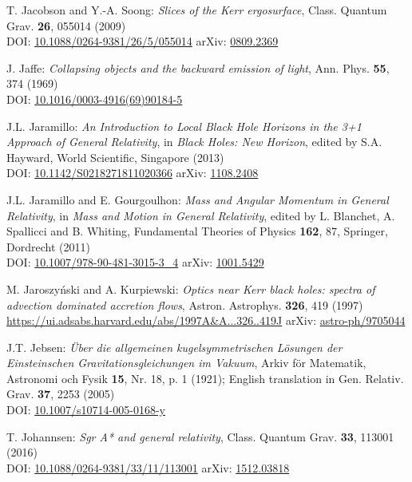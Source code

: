 \begin{thebibliography}{123}
T. Jacobson and Y.-A. Soong:
{\em Slices of the Kerr ergosurface},
Class. Quantum Grav. {\bf 26}, 055014 (2009)\\
DOI: \href{https://doi.org/10.1088/0264-9381/26/5/055014}{10.1088/0264-9381/26/5/055014}\hfill
arXiv: \href{https://arxiv.org/abs/0809.2369}{0809.2369}

J. Jaffe:
{\em Collapsing objects and the backward emission of light},
Ann. Phys. {\bf 55}, 374 (1969)\\
DOI: \href{https://doi.org/10.1016/0003-4916(69)90184-5}{10.1016/0003-4916(69)90184-5}

J.L. Jaramillo: {\em An Introduction to Local Black Hole Horizons in the 3+1
Approach of General Relativity}, in {\em Black Holes: New Horizon}, edited
by S.A. Hayward, World Scientific, Singapore (2013)\\
DOI: \href{https://doi.org/10.1142/S0218271811020366}{10.1142/S0218271811020366}\hfill
arXiv: \href{https://arxiv.org/abs/1108.2408}{1108.2408}

J.L. Jaramillo and E. Gourgoulhon:
{\em Mass and Angular Momentum in General Relativity},
in \emph{Mass and Motion in General Relativity}, edited by L. Blanchet, A. Spallicci and B. Whiting, Fundamental Theories of Physics {\bf 162}, 87,
Springer, Dordrecht (2011) \\
DOI: \href{https://doi.org/10.1007/978-90-481-3015-3_4}{10.1007/978-90-481-3015-3\_4}\hfill
arXiv: \href{https://arxiv.org/abs/1001.5429}{1001.5429}

M. Jaroszy\'nski and A. Kurpiewski:
{\em Optics near Kerr black holes: spectra of advection dominated accretion flows},
Astron. Astrophys. {\bf 326}, 419 (1997)\\
\url{https://ui.adsabs.harvard.edu/abs/1997A&A...326..419J}\hfill
arXiv: \href{https://arxiv.org/abs/astro-ph/9705044}{astro-ph/9705044}

J.T. Jebsen:
{\em Über die allgemeinen kugelsymmetrischen Lösungen der Einsteinschen
Gravitationsgleichungen im Vakuum},
Arkiv för Matematik, Astronomi och Fysik {\bf 15}, Nr. 18, p. 1 (1921);
English translation in
Gen. Relativ. Grav. {\bf 37}, 2253 (2005)\\
DOI: \href{https://doi.org/10.1007/s10714-005-0168-y}{10.1007/s10714-005-0168-y}

T. Johannsen:
{\em Sgr A* and general relativity},
Class. Quantum Grav.  {\bf 33}, 113001 (2016)\\
DOI: \href{https://doi.org/10.1088/0264-9381/33/11/113001}{10.1088/0264-9381/33/11/113001}\hfill
arXiv: \href{https://arxiv.org/abs/1512.03818}{1512.03818}


\end{thebibliography}
